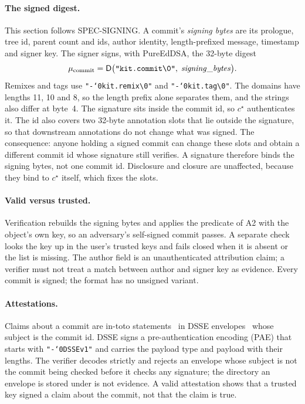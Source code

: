 \documentclass[10pt,letterpaper]{article}
\theoremstyle{remark}
\newcommand{\D}{\mathsf{D}}
\newcommand{\str}[1]{\texttt{"\romannumeral-`0#1"}}
\begin{document}
\paragraph{The signed digest.}
This section follows SPEC-SIGNING. A commit's \emph{signing bytes} are its
prologue, tree id, parent count and ids, author identity, length-prefixed
message, timestamp and signer key. The signer signs, with PureEdDSA, the
32-byte digest
\begin{equation}\label{eq:sig}
  \mu_{\text{commit}} = \D\bigl(\str{kit.commit\textbackslash 0},\;
  \mathit{signing\_bytes}\bigr).
\end{equation}
Remixes and tags use \str{kit.remix\textbackslash 0} and
\str{kit.tag\textbackslash 0}. The domains have lengths 11, 10 and 8, so the
length prefix alone separates them, and the strings also differ at byte~4. The
signature sits inside the commit id, so $c^\star$ authenticates it. The id also
covers two 32-byte annotation slots that lie outside the signature, so that
downstream annotations do not change what was signed. The consequence: anyone
holding a signed commit can change these slots and obtain a different commit
id whose signature still verifies. A signature therefore binds the signing
bytes, not one commit id. Disclosure and closure are unaffected, because they
bind to $c^\star$ itself, which fixes the slots.

\paragraph{Valid versus trusted.}
Verification rebuilds the signing bytes and applies the predicate of A2 with
the object's own key, so an adversary's self-signed commit passes. A separate
check looks the key up in the user's trusted keys and fails closed when it is
absent or the list is missing. The author field is an unauthenticated
attribution claim; a verifier must not treat a match between author and signer
key as evidence. Every commit is signed; the format has no unsigned variant.

\paragraph{Attestations.}
Claims about a commit are in-toto statements~\cite{intoto} in DSSE
envelopes~\cite{dsse} whose subject is the commit id. DSSE signs a
pre-authentication encoding (PAE) that starts with \str{DSSEv1} and carries the
payload type and payload with their lengths. The verifier decodes strictly and
rejects an envelope whose subject is not the commit being checked before it
checks any signature; the directory an envelope is stored under is not
evidence. A valid attestation shows that a trusted key signed a claim about the
commit, not that the claim is true.
\end{document}
